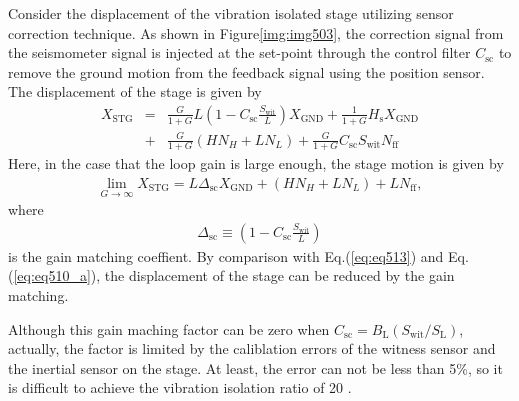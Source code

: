 Consider the displacement of the vibration isolated stage utilizing sensor correction technique. As shown in Figure\ref{img:img503}, the correction signal from the seismometer signal is injected at the set-point through the control filter $C_{\mathrm{sc}}$ to remove the ground motion from the feedback signal using the position sensor. The displacement of the stage is given by 
\begin{eqnarray}\nonumber
  X_{\mathrm{STG}} &=&\frac{G}{1+G}L\left(1-C_{\mathrm{sc}}\frac{S_{\mathrm{wit}}}{L}\right) X_{\mathrm{GND}} + \frac{1}{1+G}H_{\mathrm{s}}X_{\mathrm{GND}}\\ 
  &+& \frac{G}{1+G}\left(HN_{H}+LN_{L}\right) + \frac{G}{1+G}C_{\mathrm{sc}}S_{\mathrm{wit}}N_{\mathrm{ff}} \label{eq:eq511}
\end{eqnarray}
Here, in the case that the loop gain is large enough, the stage motion is given by 
\begin{eqnarray}
  \lim_{G\to\infty} X_{\mathrm{STG}} = L\Delta_{\mathrm{sc}} X_{\mathrm{GND}} + \left(HN_{H}+LN_{L}\right) + {L}N_{\mathrm{ff}} \label{eq:eq513},
\end{eqnarray}
where 
\begin{eqnarray}
  \Delta_{\mathrm{sc}} \equiv \left(1-C_{\mathrm{sc}}\frac{S_{\mathrm{wit}}}{L}\right) \label{eq:eq512}
\end{eqnarray}
is the gain matching coeffient. By comparison with Eq.(\ref{eq:eq513}) and Eq.(\ref{eq:eq510_a}), the displacement of the stage can be reduced by the gain matching.

Although this gain maching factor can be zero when $C_{\mathrm{sc}}=B_{\mathrm{L}}(S_{\mathrm{wit}}/S_{\mathrm{L}})$, actually, the factor is limited by the caliblation errors of the witness sensor and the inertial sensor on the stage. At least, the error can not be less than 5\%, so it is difficult to achieve the vibration isolation ratio of 20 \cite{hua2005low}.

